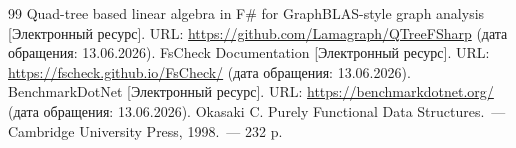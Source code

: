 \documentclass[a4paper,12pt]{article}
\begin{document}
\renewcommand{\refname}{Литература}
\begin{thebibliography}{99}
     Quad-tree based linear algebra in F\# for GraphBLAS-style graph analysis [Электронный ресурс]. URL: \url{https://github.com/Lamagraph/QTreeFSharp} (дата обращения: 13.06.2026).
     FsCheck Documentation [Электронный ресурс]. URL: \url{https://fscheck.github.io/FsCheck/} (дата обращения: 13.06.2026).
     BenchmarkDotNet [Электронный ресурс]. URL: \url{https://benchmarkdotnet.org/} (дата обращения: 13.06.2026).
     Okasaki C. Purely Functional Data Structures.~--- Cambridge University Press, 1998.~--- 232 p.
\end{thebibliography}
\end{document}
